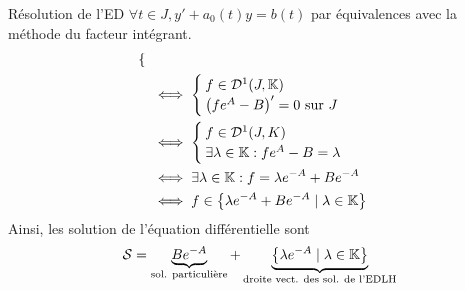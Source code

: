 \documentclass{article}
\renewenvironment{question_kholle}[2][ ]
{
	\subsection{\texorpdfstring{#2}{}}
	\notblank{#1}
	{
		\noindent #1
		\bigbreak
	}
	{}
	\begin{proof}
}
{
	\end{proof}
}
\begin{document}
\begin{question_kholle}{Résolution de l'ED  $\forall t \in J, y' + a_{0}(t)y = b(t)$ par équivalences avec la méthode du facteur intégrant.}
\begin{align*}
\begin{cases}
		                                                                                                                             \end{cases}                                                                                                                              \\
		                                                                                                                      & \iff \begin{cases}
			                                                                                                                             f\in\mathcal{D}^1(J,\mathbb K) \\
			                                                                                                                             \left(f e^{A}-B\right)' = 0 \text{ sur } J
		                                                                                                                             \end{cases}                                                                                                                             \\
		                                                                                                                      & \iff \begin{cases}
			                                                                                                                             f\in\mathcal{D}^{1}(J,K) \\
			                                                                                                                             \exists \lambda\in\mathbb K: f e^{A}-B=\lambda
		                                                                                                                             \end{cases}                                                                                                                                \\
		                                                                                                                      & \iff \exists \lambda\in\mathbb K: f=\lambda e^{-A}+B e^{-A}                                                                                                                       \\
		                                                                                                                      & \iff f\in \left\{\lambda e^{-A}+B e^{-A} \mid \lambda\in\mathbb K\right\}
	\end{align*}
	Ainsi, les solution de l’équation différentielle sont
	\[
		\mathcal{S}=\underbrace{B e^{-A}}_{\text{sol. particulière}} + \underbrace{\left\{\lambda e^{-A} \mid \lambda\in\mathbb K\right\}}_{\text{droite vect. des sol. de l'EDLH}}
	\]
\end{question_kholle}
\end{document}
